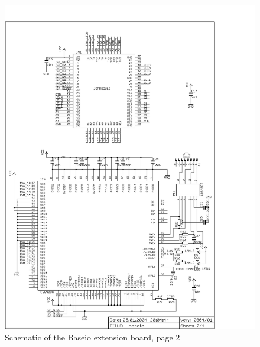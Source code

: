 \begin{figure}
    \centering
    \includegraphics[scale=0.68]{appendix/baseio_p2}
    \caption{Schematic of the Baseio extension board, page 2}
\end{figure}
